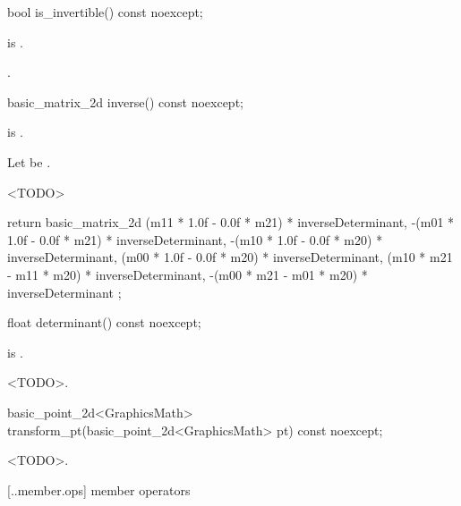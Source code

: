 %
\begin{itemdecl}
bool is_invertible() const noexcept;
\end{itemdecl}
\begin{itemdescr}
\pnum
\requires
{} is .

\pnum
\returns
{}.
\end{itemdescr}

%
\begin{itemdecl}
basic_matrix_2d inverse() const noexcept;
\end{itemdecl}
\begin{itemdescr}
\pnum
\requires
{} is .

\pnum
\returns
Let  be .

<TODO>\begin{codeblock}
return basic_matrix_2d{
   (m11 * 1.0f - 0.0f * m21) * inverseDeterminant,
  -(m01 * 1.0f - 0.0f * m21) * inverseDeterminant,
  -(m10 * 1.0f - 0.0f * m20) * inverseDeterminant,
   (m00 * 1.0f - 0.0f * m20) * inverseDeterminant,
   (m10 * m21 - m11 * m20) * inverseDeterminant,
  -(m00 * m21 - m01 * m20) * inverseDeterminant
};
\end{codeblock}
\end{itemdescr}

%
\begin{itemdecl}
float determinant() const noexcept;
\end{itemdecl}
\begin{itemdescr}
\pnum
\requires
{} is .

\pnum
\returns
<TODO>.
\end{itemdescr}

%
\begin{itemdecl}
basic_point_2d<GraphicsMath> transform_pt(basic_point_2d<GraphicsMath> pt) const noexcept;
\end{itemdecl}
\begin{itemdescr}
\pnum
\returns
<TODO>.
\end{itemdescr}

 [\iotwod.\matrixtwod.member.ops] { member operators}


